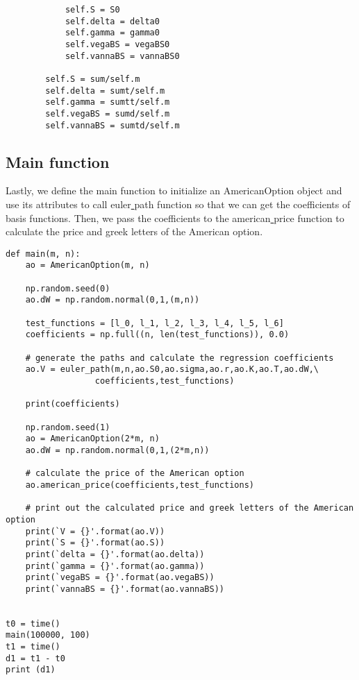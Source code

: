 \documentclass[11pt, oneside]{article}   	%
\begin{document}
\begin{lstlisting}
            self.S = S0
            self.delta = delta0
            self.gamma = gamma0
            self.vegaBS = vegaBS0
            self.vannaBS = vannaBS0

        self.S = sum/self.m
        self.delta = sumt/self.m
        self.gamma = sumtt/self.m
        self.vegaBS = sumd/self.m
        self.vannaBS = sumtd/self.m
\end{lstlisting}


\subsection{Main function}
Lastly, we define the main function to initialize an AmericanOption object and use its attributes to call euler\underline{ }path function so that we can get the coefficients of basis functions. Then, we pass the coefficients to the american\underline{ }price function to calculate the price and greek letters of the American option.
\lstset{language=Python}
\lstset{frame=lines}
\lstset{basicstyle=\footnotesize}
\begin{lstlisting}
def main(m, n):
    ao = AmericanOption(m, n)

    np.random.seed(0)
    ao.dW = np.random.normal(0,1,(m,n))

    test_functions = [l_0, l_1, l_2, l_3, l_4, l_5, l_6]
    coefficients = np.full((n, len(test_functions)), 0.0)

    # generate the paths and calculate the regression coefficients
    ao.V = euler_path(m,n,ao.S0,ao.sigma,ao.r,ao.K,ao.T,ao.dW,\
    		      coefficients,test_functions)

    print(coefficients)

    np.random.seed(1)
    ao = AmericanOption(2*m, n)
    ao.dW = np.random.normal(0,1,(2*m,n))

    # calculate the price of the American option
    ao.american_price(coefficients,test_functions)

    # print out the calculated price and greek letters of the American option
    print(`V = {}'.format(ao.V))
    print(`S = {}'.format(ao.S))
    print(`delta = {}'.format(ao.delta))
    print(`gamma = {}'.format(ao.gamma))
    print(`vegaBS = {}'.format(ao.vegaBS))
    print(`vannaBS = {}'.format(ao.vannaBS))


t0 = time()
main(100000, 100)
t1 = time()
d1 = t1 - t0
print (d1)
\end{lstlisting}
\end{document}
